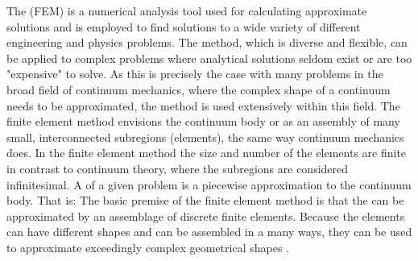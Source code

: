 
\label{sec:finite_element_method}
The  (FEM) is a numerical analysis tool
used for calculating approximate solutions and is employed to find
solutions to a wide variety of different engineering and physics
problems.
%
The method, which is diverse and flexible, can be applied to complex
problems where analytical solutions seldom exist or are too "expensive"
to solve. As this is precisely the case with many problems in the broad
field of continuum mechanics, where the complex shape of a continuum
needs to be approximated, the method is used extensively within this
field.
%
The finite element method envisions the continuum body or
 as an assembly of many small,
interconnected subregions (elements), the same way continuum mechanics
does.
In the finite element method the size and number of the elements are
finite in contrast to continuum theory, where the subregions are
considered infinitesimal.
A  of a given problem is a
piecewise approximation to the continuum body. That is: The basic
premise of the finite element method is that the  can be approximated by an assemblage of discrete finite
elements. Because the elements can have different shapes and can be
assembled in a many ways, they can be used to approximate exceedingly
complex geometrical shapes .

